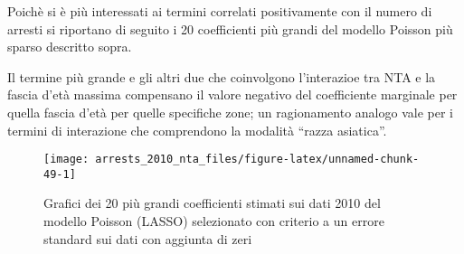 \documentclass[
  ,
]{article}
\begin{document}
Poichè si è più interessati ai termini correlati positivamente con il numero di arresti si riportano di seguito i 20 coefficienti più grandi del modello Poisson più sparso descritto sopra.

Il termine più grande e gli altri due che coinvolgono l'interazioe tra NTA e la fascia d'età massima compensano il valore negativo del coefficiente marginale per quella fascia d'età per quelle specifiche zone; un ragionamento analogo vale per i termini di interazione che comprendono la modalità ``razza asiatica''.

\begin{figure}

{\centering \texttt{[image: arrests\_2010\_nta\_files/figure-latex/unnamed-chunk-49-1]} 

}

\caption{Grafici dei 20 più grandi coefficienti stimati sui dati 2010 del modello Poisson (LASSO) selezionato con criterio a un errore standard sui dati con aggiunta di zeri}\label{fig:unnamed-chunk-49}
\end{figure}
\end{document}
